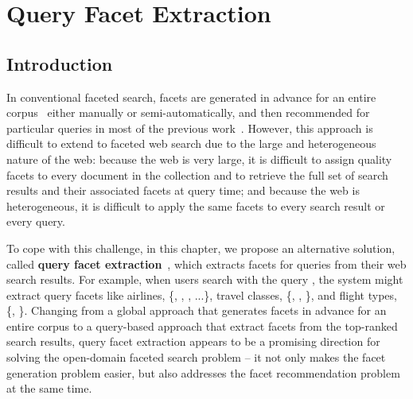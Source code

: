 \chapter{Query Facet Extraction}
\label{ch:facet}
\section{Introduction}
In conventional faceted search, facets are generated in advance for an entire corpus~\cite{stoica2007automating,dakka2008automatic} either manually or semi-automatically, and then recommended for particular queries in most of the previous work~\cite{teevan2008challenges}. However, this approach is difficult to extend to faceted web search due to the large and heterogeneous nature of the web: because the web is very large, it is
difficult to assign quality facets to every document in the collection and to retrieve the full set of search results and their associated facets at query time; and because the web is heterogeneous, it is difficult to apply the same facets to every search result or every query.

To cope with this challenge, in this chapter, we propose an alternative solution, called \textbf{query facet extraction}~\cite{kong2013extracting}, which extracts facets for queries from their web search results. For example, when users search with the query , the system might extract query facets like airlines, \{, , , ...\}, travel classes, \{, , \}, and flight types, \{, \}. Changing from a global approach that generates facets in advance for an entire corpus to a query-based approach that extract facets from the top-ranked search results, query facet extraction appears to be a promising direction for solving the open-domain faceted search problem -- it not only makes the facet generation problem easier, but also addresses the facet recommendation problem at the same time.


